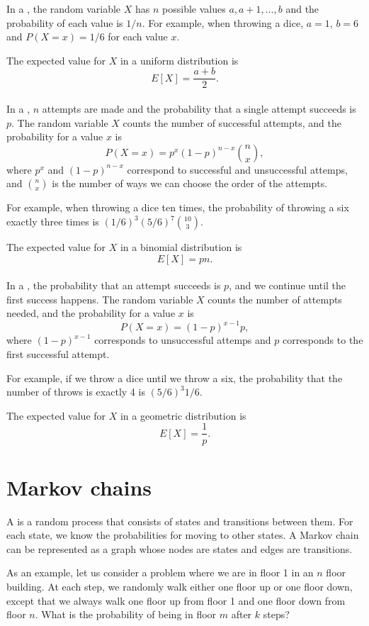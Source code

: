 In a ,
the random variable $X$ has $n$ possible
values $a,a+1,\ldots,b$ and the probability of each value is $1/n$.
For example, when throwing a dice,
$a=1$, $b=6$ and $P(X=x)=1/6$ for each value $x$.

The expected value for $X$ in a uniform distribution is
\[E[X] = \frac{a+b}{2}.\]
~\\
In a , $n$ attempts
are made
and the probability that a single attempt succeeds
is $p$.
The random variable $X$ counts the number of
successful attempts,
and the probability for a value $x$ is
\[P(X=x)=p^x (1-p)^{n-x} {n \choose x},\]
where $p^x$ and $(1-p)^{n-x}$ correspond to
successful and unsuccessful attemps,
and ${n \choose x}$ is the number of ways
we can choose the order of the attempts.

For example, when throwing a dice ten times,
the probability of throwing a six exactly
three times is $(1/6)^3 (5/6)^7 {10 \choose 3}$.

The expected value for $X$ in a binomial distribution is
\[E[X] = pn.\]
~\\
In a ,
the probability that an attempt succeeds is $p$,
and we continue until the first success happens.
The random variable $X$ counts the number
of attempts needed, and the probability for
a value $x$ is
\[P(X=x)=(1-p)^{x-1} p,\]
where $(1-p)^{x-1}$ corresponds to unsuccessful attemps
and $p$ corresponds to the first successful attempt.

For example, if we throw a dice until we throw a six,
the probability that the number of throws
is exactly 4 is $(5/6)^3 1/6$.

The expected value for $X$ in a geometric distribution is
\[E[X]=\frac{1}{p}.\]

\section{Markov chains}


A  is a random process
that consists of states and transitions between them.
For each state, we know the probabilities
for moving to other states.
A Markov chain can be represented as a graph
whose nodes are states and edges are transitions.

As an example, let us consider a problem
where we are in floor 1 in an $n$ floor building.
At each step, we randomly walk either one floor
up or one floor down, except that we always
walk one floor up from floor 1 and one floor down
from floor $n$.
What is the probability of being in floor $m$
after $k$ steps?

